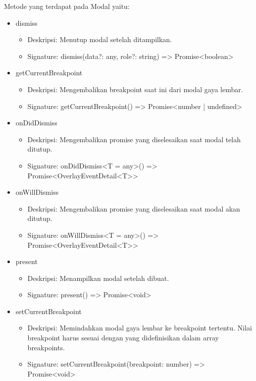 Metode yang terdapat pada Modal yaitu:
\begin{itemize}
    \item dismiss
    \begin{itemize}
        \item Deskripsi: Menutup modal setelah ditampilkan.
        \item Signature: dismiss(data?: any, role?: string) => Promise<boolean>
    \end{itemize}

    \item getCurrentBreakpoint
    \begin{itemize}
        \item Deskripsi: Mengembalikan breakpoint saat ini dari modal gaya lembar.
        \item Signature: getCurrentBreakpoint() => Promise<number | undefined>
    \end{itemize}

    \item onDidDismiss
    \begin{itemize}
        \item Deskripsi: Mengembalikan promise yang diselesaikan saat modal telah ditutup.
        \item Signature: onDidDismiss<T = any>() => Promise<OverlayEventDetail<T>>
    \end{itemize}

    \item onWillDismiss
    \begin{itemize}
        \item Deskripsi: Mengembalikan promise yang diselesaikan saat modal akan ditutup.
        \item Signature: onWillDismiss<T = any>() => Promise<OverlayEventDetail<T>>
    \end{itemize}

    \item present
    \begin{itemize}
        \item Deskripsi: Menampilkan modal setelah dibuat.
        \item Signature: present() => Promise<void>
    \end{itemize}

    \item setCurrentBreakpoint
    \begin{itemize}
        \item Deskripsi: Memindahkan modal gaya lembar ke breakpoint tertentu. Nilai breakpoint harus sesuai dengan yang didefinisikan dalam array breakpoints.
        \item Signature: setCurrentBreakpoint(breakpoint: number) => Promise<void>
    \end{itemize}
\end{itemize}

